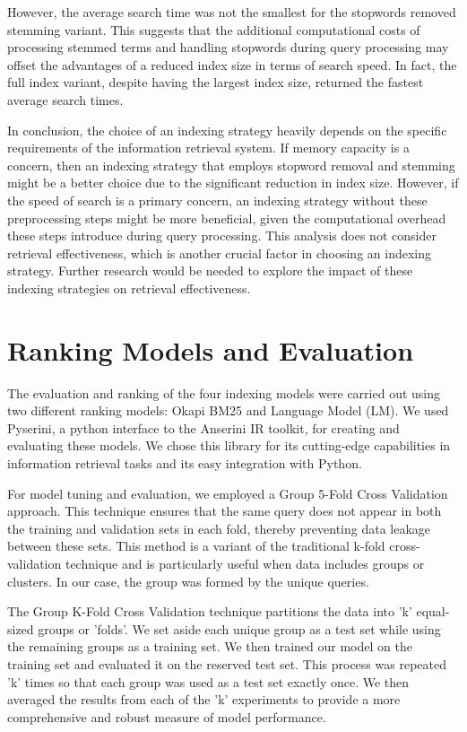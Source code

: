 \documentclass[11pt,a4paper]{article}
\begin{document}
However, the average search time was not the smallest for the
stopwords removed stemming variant. This suggests that the additional
computational costs of processing stemmed terms and handling
stopwords during query processing may offset the advantages of a
reduced index size in terms of search speed. In fact, the full index
variant, despite having the largest index size, returned the fastest
average search times.

In conclusion, the choice of an indexing strategy heavily depends on
the specific requirements of the information retrieval system. If
memory capacity is a concern, then an indexing strategy that employs
stopword removal and stemming might be a better choice due to the
significant reduction in index size. However, if the speed of search
is a primary concern, an indexing strategy without these
preprocessing steps might be more beneficial, given the computational
overhead these steps introduce during query processing. This analysis
does not consider retrieval effectiveness, which is another crucial
factor in choosing an indexing strategy. Further research would be
needed to explore the impact of these indexing strategies on
retrieval effectiveness.

\section{Ranking Models and Evaluation}

The evaluation and ranking of the four indexing models were carried
out using two different ranking models: Okapi BM25 and Language Model
(LM). We used Pyserini, a python interface to the Anserini IR
toolkit, for creating and evaluating these models. We chose this
library for its cutting-edge capabilities in information retrieval
tasks and its easy integration with Python.

For model tuning and evaluation, we employed a Group 5-Fold Cross
Validation approach. This technique ensures that the same query does
not appear in both the training and validation sets in each fold,
thereby preventing data leakage between these sets. This method is a
variant of the traditional k-fold cross-validation technique and is
particularly useful when data includes groups or clusters. In our
case, the group was formed by the unique queries.

The Group K-Fold Cross Validation technique partitions the data into
'k' equal-sized groups or 'folds'. We set aside each unique group as
a test set while using the remaining groups as a training set. We
then trained our model on the training set and evaluated it on the
reserved test set. This process was repeated 'k' times so that each
group was used as a test set exactly once. We then averaged the
results from each of the 'k' experiments to provide a more
comprehensive and robust measure of model performance.
\end{document}
